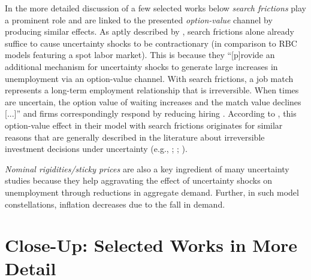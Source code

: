 \documentclass[a4paper,11pt,listof=nochaptergap,oneside,pointednumbers,bibtotoc,bigheadings,liststotoc,hidelinks]{scrbook}
\theoremstyle{mysatz}
\theoremstyle{mydefinition}
\theoremstyle{mytheorem}
\theoremstyle{mybemerkung}
\begin{document}
In the more detailed discussion of a few selected works below \textit{search frictions} play a prominent role and are linked to the presented \textit{option-value} channel by producing similar effects. As aptly described by \citet{leducandliu:16}, search frictions alone already suffice to cause uncertainty shocks to be contractionary (in comparison to RBC models featuring a spot labor market). This is because they ``[p]rovide an additional mechanism for uncertainty shocks to generate large increases in unemployment via an option-value channel. With search frictions, a job match represents a long-term employment relationship that is irreversible. When times are uncertain, the option value of waiting increases and the match value declines [...]'' and firms correspondingly respond by reducing hiring \citep[p. 2]{leducandliu:16}. According to \citet{leducandliu:16}, this option-value effect in their model with search frictions originates for similar reasons that are generally described in the literature about irreversible investment decisions under uncertainty (e.g., \citealp{bernanke:83}; \citealp{bloom:09}; \citealp{bloometal:12}).

\textit{Nominal rigidities/sticky prices} are also a key ingredient of many uncertainty studies because they help aggravating the effect of uncertainty shocks on unemployment through reductions in aggregate demand. Further, in such model constellations, inflation decreases due to the fall in demand.


\section[Close-Up: Selected Works in More Detail]{Close-Up: Selected Works in More Detail}
\label{sec:selectedworkindetail}
\end{document}
